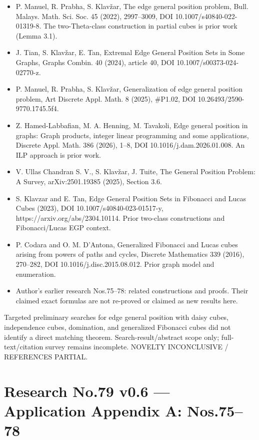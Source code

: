 \documentclass[
]{article}
\begin{document}
\begin{itemize}
\item
  P. Manuel, R. Prabha, S. Klavžar, The edge general position problem,
  Bull. Malays. Math. Sci. Soc. 45 (2022), 2997--3009, DOI
  10.1007/s40840-022-01319-8. The two-Theta-class construction in
  partial cubes is prior work (Lemma 3.1).
\item
  J. Tian, S. Klavžar, E. Tan, Extremal Edge General Position Sets in
  Some Graphs, Graphs Combin. 40 (2024), article 40, DOI
  10.1007/s00373-024-02770-z.
\item
  P. Manuel, R. Prabha, S. Klavžar, Generalization of edge general
  position problem, Art Discrete Appl. Math. 8 (2025), \#P1.02, DOI
  10.26493/2590-9770.1745.5f4.
\item
  Z. Hamed-Labbafian, M. A. Henning, M. Tavakoli, Edge general position
  in graphs: Graph products, integer linear programming and some
  applications, Discrete Appl. Math. 386 (2026), 1--8, DOI
  10.1016/j.dam.2026.01.008. An ILP approach is prior work.
\item
  V. Ullas Chandran S. V., S. Klavžar, J. Tuite, The General Position
  Problem: A Survey, arXiv:2501.19385 (2025), Section 3.6.
\item
  S. Klavzar and E. Tan, Edge General Position Sets in Fibonacci and
  Lucas Cubes (2023), DOI 10.1007/s40840-023-01517-y,
  https://arxiv.org/abs/2304.10114. Prior two-class constructions and
  Fibonacci/Lucas EGP context.
\item
  P. Codara and O. M. D'Antona, Generalized Fibonacci and Lucas cubes
  arising from powers of paths and cycles, Discrete Mathematics 339
  (2016), 270--282, DOI 10.1016/j.disc.2015.08.012. Prior graph model
  and enumeration.
\item
  Author's earlier research Nos.75--78: related constructions and
  proofs. Their claimed exact formulas are not re-proved or claimed as
  new results here.
\end{itemize}

Targeted preliminary searches for edge general position with daisy
cubes, independence cubes, domination, and generalized Fibonacci cubes
did not identify a direct matching theorem. Search-result/abstract scope
only; full-text/citation survey remains incomplete. NOVELTY INCONCLUSIVE
/ REFERENCES PARTIAL.

\newpage

\section{Research No.79 v0.6 --- Application Appendix A:
Nos.75--78}\label{research-no.79-v0.6-application-appendix-a-nos.7578}
\end{document}
